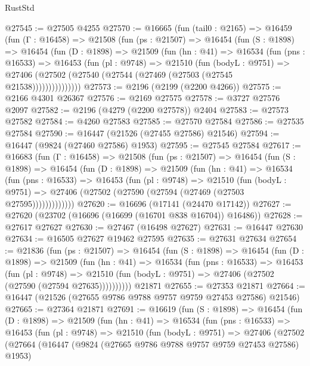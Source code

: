 \begin{lexlean}{RustStd}
\begin{coremodule}
@27545 := @27505 @4255
@27570 := @16665
    (fun (tail0 : @2165) =>
    @16459
      (fun (Γ : @16458) =>
      @21508
        (fun (ps : @21507) =>
        @16454
          (fun (S : @1898) =>
          @16454
            (fun (D : @1898) =>
            @21509
              (fun (hn : @41) =>
              @16534
                (fun (pns : @16533) =>
                @16453
                  (fun (pl : @9748) =>
                  @21510
                    (fun (bodyL : @9751) =>
                    @27406 (@27502 (@27540 (@27544 (@27469 (@27503 (@27545 @21538)))))))))))))))
@27573 := @2196 (@2199 (@2200 @4266))
@27575 := @2166 @4301 @26367
@27576 := @2169 @27575
@27578 := @3727 @27576 @2097
@27582 := @2196 (@4279 (@2200 @27578)) @2404
@27583 := @27573 @27582
@27584 := @4260 @27583
@27585 := @27570 @27584
@27586 := @27535 @27584
@27590 := @16447 (@21526 (@27455 @27586) @21546)
@27594 := @16447 (@9824 (@27460 @27586) @1953)
@27595 := @27545 @27584
@27617 := @16683
    (fun (Γ : @16458) =>
    @21508
      (fun (ps : @21507) =>
      @16454
        (fun (S : @1898) =>
        @16454
          (fun (D : @1898) =>
          @21509
            (fun (hn : @41) =>
            @16534
              (fun (pns : @16533) =>
              @16453
                (fun (pl : @9748) =>
                @21510
                  (fun (bodyL : @9751) =>
                  @27406 (@27502 (@27590 (@27594 (@27469 (@27503 @27595)))))))))))))
@27620 := @16696 (@17141 (@24470 @17142))
@27627 := @27620 (@23702 (@16696 (@16699 (@16701 @838 @16704)) @16486))
@27628 := @27617 @27627
@27630 := @27467 (@16498 @27627)
@27631 := @16447 @27630
@27634 := @16505 @27627 @19462 @27595
@27635 := @27631 @27634
@27654 := @21836
    (fun (ps : @21507) =>
    @16454
      (fun (S : @1898) =>
      @16454
        (fun (D : @1898) =>
        @21509
          (fun (hn : @41) =>
          @16534
            (fun (pns : @16533) =>
            @16453
              (fun (pl : @9748) =>
              @21510 (fun (bodyL : @9751) => @27406 (@27502 (@27590 (@27594 @27635))))))))))
    @21871
@27655 := @27353 @21871
@27664 := @16447 (@21526 (@27655 @9786 @9788 @9757 @9759 @27453 @27586) @21546)
@27665 := @27364 @21871
@27691 := @16619
    (fun (S : @1898) =>
    @16454
      (fun (D : @1898) =>
      @21509
        (fun (hn : @41) =>
        @16534
          (fun (pns : @16533) =>
          @16453
            (fun (pl : @9748) =>
            @21510
              (fun (bodyL : @9751) =>
              @27406
                (@27502
                  (@27664
                    (@16447
                      (@9824 (@27665 @9786 @9788 @9757 @9759 @27453 @27586) @1953)

\end{coremodule}
\end{lexlean}
